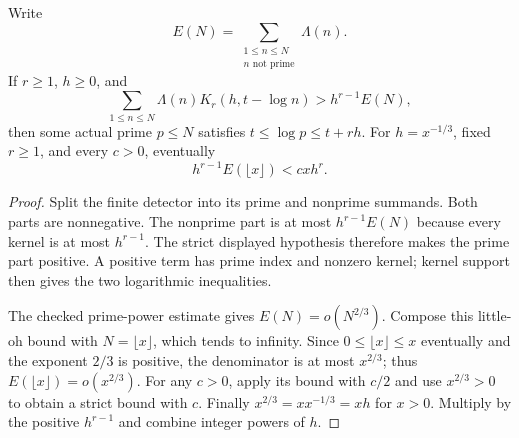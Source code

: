 \begin{lemma}
\label{kernel:prime-extraction}
\leanok
Write
\[
 E(N)=\sum_{\substack{1\leq n\leq N\\ n\text{ not prime}}}\Lambda(n).
\]
If $r\geq1$, $h\geq0$, and
\[
 \sum_{1\leq n\leq N}\Lambda(n)K_r(h,t-\log n)
      >h^{r-1}E(N),
\]
then some actual prime $p\leq N$ satisfies
$t\leq\log p\leq t+rh$.
For $h=x^{-1/3}$, fixed $r\geq1$, and every $c>0$, eventually
\[
 h^{r-1}E(\lfloor x\rfloor)<c xh^r.
\]
\end{lemma}
\begin{proof}
Split the finite detector into its prime and nonprime summands.
Both parts are nonnegative.  The nonprime part is at most
$h^{r-1}E(N)$ because every kernel is at most $h^{r-1}$.
The strict displayed hypothesis therefore makes the prime part positive.
A positive term has prime index and nonzero kernel; kernel support then
gives the two logarithmic inequalities.

The checked prime-power estimate gives $E(N)=o(N^{2/3})$.
Compose this little-oh bound with $N=\lfloor x\rfloor$, which tends
to infinity.  Since $0\leq\lfloor x\rfloor\leq x$ eventually and
the exponent $2/3$ is positive, the denominator is at most $x^{2/3}$;
thus $E(\lfloor x\rfloor)=o(x^{2/3})$.
For any $c>0$, apply its bound with $c/2$ and use $x^{2/3}>0$
to obtain a strict bound with $c$.
Finally $x^{2/3}=x x^{-1/3}=xh$ for $x>0$.
Multiply by the positive $h^{r-1}$ and combine integer powers of $h$.
\end{proof}

